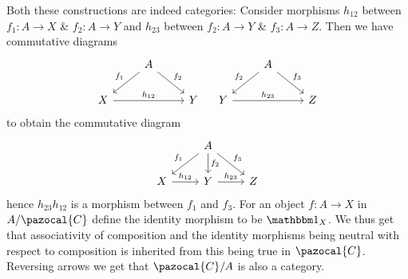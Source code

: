 \begin{remark}
    Both these constructions are indeed categories: Consider morphisms $h_{12}$ between $f_1: A\rightarrow X$ \& $f_2 : A\rightarrow Y$ and $h_{23}$ between $f_2 : A\rightarrow Y$ \& $f_3: A\rightarrow Z$. Then we have commutative diagrams
    $$\begin{tikzcd}
        & A \arrow[ld, "f_1"' ] \arrow[rd, "f_2"]\\
        X \arrow{rr}{h_{12}} & & Y
    \end{tikzcd} \quad \begin{tikzcd}  & A \arrow[ld, "f_2"' ] \arrow[rd, "f_3"]\\
        Y \arrow{rr}{h_{23}} & & Z \end{tikzcd}$$
    to obtain the commutative diagram
    $$\begin{tikzcd}
        & A \arrow[ld, "f_1"' ] \arrow[d, "f_2"] \arrow[rd, "f_3"]\\
        X \arrow[r, "h_{12}"] & Y \arrow[r, "h_{23}"] & Z
    \end{tikzcd}
    $$
    hence $h_{23}h_{12}$ is a morphism between $f_{1}$ and $f_3$. For an object $f: A \rightarrow X$ in $A/\pazocal{C}$ define the identity morphism to be $\fone_X$. We thus get that associativity of composition and the identity morphisms being neutral with respect to composition is inherited from this being true in $\pazocal{C}$. Reversing arrows we get that $\pazocal{C}/A$ is also a category.  
\end{remark}

